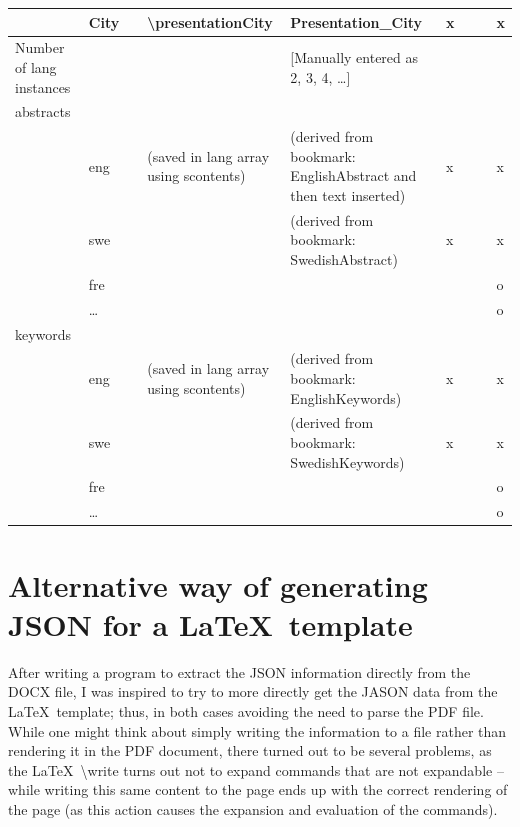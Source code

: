 \begin{landscape}
{\begin{longtable}{L{2cm}|L{4cm}|l|L{4cm}|L{4cm}|l l l l|}
 & City &  & \textbackslash presentationCity{ } & Presentation\_City & x &  &  & x \\
\hline
Number of lang instances &  &  &  & [Manually entered as 2, 3, 4, …] &  &  &  & \\
abstracts & \\
 & eng &  & (saved in lang array using scontents) & (derived from bookmark: EnglishAbstract and then text inserted) & x &  &  & x \\
 & swe &  &  & (derived from bookmark: SwedishAbstract) & x &  &  & x \\
 & fre &  & &  & o\\
 & … &  & &  & o\\
keywords & \\
 & eng &  & (saved in lang array using scontents) & (derived from bookmark: EnglishKeywords) & x &  &  & x \\
 & swe &  &  & (derived from bookmark: SwedishKeywords) & x &  &  & x \\
 & fre &  & &  & o \\
 & … &  & &  & o\\
\hline
\end{longtable}
}
\end{landscape}

\section{Alternative way of generating JSON for a \LaTeX~template}
\label{sec:AlternativeWayofGeneratingJSON}
After writing a program to extract the JSON information directly from the DOCX file, I was inspired to try to more directly get the JASON data from the \LaTeX~template; thus, in both cases avoiding the need to parse the PDF file.
While one might think about simply writing the information to a file rather than rendering it in the PDF document, there turned out to be several problems, as the \LaTeX~\textbackslash write turns out not to expand commands that are not expandable – while writing this same content to the page ends up with the correct rendering of the page (as this action causes the expansion and evaluation of the commands).


